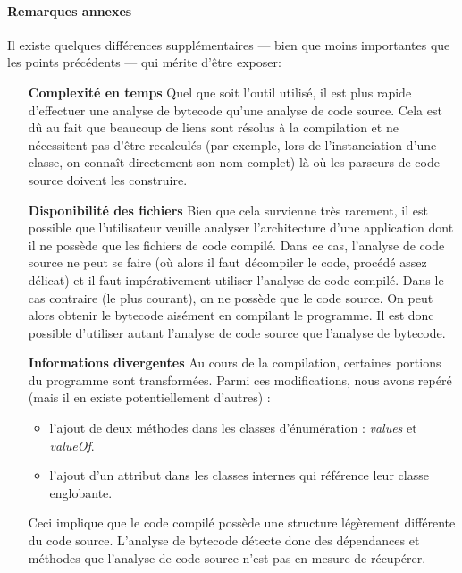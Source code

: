 \documentclass{scrartcl}
\begin{document}
        \paragraph{Remarques annexes}Il existe quelques différences supplémentaires --- bien que moins importantes que les points précédents --- qui mérite d'être exposer:
        \begin{itemize}
        	\item[\textbf{Complexité en temps}] Quel que soit l'outil utilisé, il est plus rapide d'effectuer une analyse de bytecode qu'une analyse de code source. Cela est dû au fait que beaucoup de liens sont résolus à la compilation et ne nécessitent pas d'être recalculés (par exemple, lors de l'instanciation d'une classe, on connaît directement son nom complet) là où les parseurs de code source doivent les construire.
        	\item[\textbf{Disponibilité des fichiers}] Bien que cela survienne très rarement, il est possible que l'utilisateur veuille analyser l'architecture d'une application dont il ne possède que les fichiers de code compilé. Dans ce cas, l'analyse de code source ne peut se faire (où alors il faut décompiler le code, procédé assez délicat) et il faut impérativement utiliser l'analyse de code compilé. Dans le cas contraire (le plus courant), on ne possède que le code source. On peut alors obtenir le bytecode aisément en compilant le programme. Il est donc possible d'utiliser autant l'analyse de code source que l'analyse de bytecode.
        	\item[\textbf{Informations divergentes}] Au cours de la compilation, certaines portions du programme sont transformées. Parmi ces modifications, nous avons repéré (mais il en existe potentiellement d'autres) :
        	\begin{itemize}
        	    \item l'ajout de deux méthodes dans les classes d'énumération : \emph{values} et \emph{valueOf}.
        	    \item l'ajout d'un attribut dans les classes internes qui référence leur classe englobante.
        	\end{itemize}
        	Ceci implique que le code compilé possède une structure légèrement différente du code source. L'analyse de bytecode détecte donc des dépendances et méthodes que l'analyse de code source n'est pas en mesure de récupérer. 
        \end{itemize}
        
        
        
\end{document}
